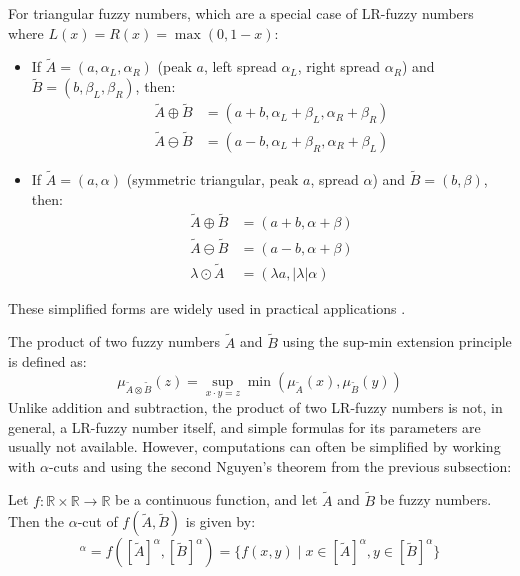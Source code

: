 \begin{remark}
For triangular fuzzy numbers, which are a special case of LR-fuzzy numbers where $L(x)=R(x)=\max(0, 1-x)$:
\begin{itemize}
    \item If $\tilde{A} = (a, \alpha_L, \alpha_R)$ (peak $a$, left spread $\alpha_L$, right spread $\alpha_R$) and $\tilde{B} = (b, \beta_L, \beta_R)$, then:
    \begin{align*}
    \tilde{A} \oplus \tilde{B} &= (a+b, \alpha_L+\beta_L, \alpha_R+\beta_R) \\
    \tilde{A} \ominus \tilde{B} &= (a-b, \alpha_L+\beta_R, \alpha_R+\beta_L)
    \end{align*}
    \item If $\tilde{A} = (a, \alpha)$ (symmetric triangular, peak $a$, spread $\alpha$) and $\tilde{B} = (b, \beta)$, then:
    \begin{align*}
    \tilde{A} \oplus \tilde{B} &= (a+b, \alpha+\beta) \\
    \tilde{A} \ominus \tilde{B} &= (a-b, \alpha+\beta) \\
    \lambda \odot \tilde{A} &= (\lambda a, |\lambda|\alpha)
    \end{align*}
\end{itemize}
These simplified forms are widely used in practical applications \cite[p.17]{FULLER2}.
\end{remark}


The product of two fuzzy numbers $\tilde{A}$ and $\tilde{B}$ using the sup-min extension principle is defined as:
\begin{equation}
\mu_{\tilde{A} \otimes \tilde{B}}(z) = \sup_{x \cdot y = z} \min(\mu_{\tilde{A}}(x), \mu_{\tilde{B}}(y))
\end{equation}
Unlike addition and subtraction, the product of two LR-fuzzy numbers is not, in general, a LR-fuzzy number itself, and simple formulas for its parameters are usually not available.
However, computations can often be simplified by working with $\alpha$-cuts and using the second Nguyen's theorem from the previous subsection:

\begin{theorem}
\label{thm:alpha_cut_product}
Let $f: \mathbb{R} \times \mathbb{R} \to \mathbb{R}$ be a continuous function, and let $\tilde{A}$ and $\tilde{B}$ be fuzzy numbers. Then the $\alpha$-cut of $f(\tilde{A}, \tilde{B})$ is given by:
\begin{equation}
[f(\tilde{A}, \tilde{B})]^\alpha = f([\tilde{A}]^\alpha, [\tilde{B}]^\alpha) = \{f(x,y) \mid x \in [\tilde{A}]^\alpha, y \in [\tilde{B}]^\alpha \}
\end{equation}
\end{theorem}

